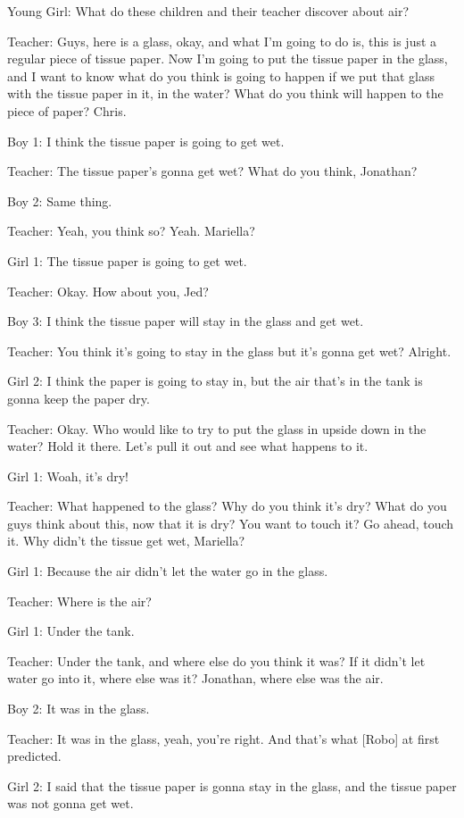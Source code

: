 Young Girl: What do these children and their teacher discover about air?

Teacher: Guys, here is a glass, okay, and what I'm going to do is, this is just a regular piece of tissue paper. Now I'm going to put the tissue paper in the glass, and I want to know what do you think is going to happen if we put that glass with the tissue paper in it, in the water? What do you think will happen to the piece of paper? Chris.

Boy 1: I think the tissue paper is going to get wet.

Teacher: The tissue paper's gonna get wet? What do you think, Jonathan?

Boy 2: Same thing.

Teacher: Yeah, you think so? Yeah. Mariella?

Girl 1: The tissue paper is going to get wet.

Teacher: Okay. How about you, Jed?

Boy 3: I think the tissue paper will stay in the glass and get wet.

Teacher: You think it's going to stay in the glass but it's gonna get wet? Alright.

Girl 2: I think the paper is going to stay in, but the air that's in the tank is gonna keep the paper dry.

Teacher: Okay. Who would like to try to put the glass in upside down in the water? Hold it there. Let's pull it out and see what happens to it.

Girl 1: Woah, it's dry!

Teacher: What happened to the glass? Why do you think it's dry? What do you guys think about this, now that it is dry? You want to touch it? Go ahead, touch it. Why didn't the tissue get wet, Mariella?

Girl 1: Because the air didn't let the water go in the glass.

Teacher: Where is the air?

Girl 1: Under the tank.

Teacher: Under the tank, and where else do you think it was? If it didn't let water go into it, where else was it? Jonathan, where else was the air.

Boy 2: It was in the glass.

Teacher: It was in the glass, yeah, you're right. And that's what [Robo] at first predicted.

Girl 2: I said that the tissue paper is gonna stay in the glass, and the tissue paper was not gonna get wet.

